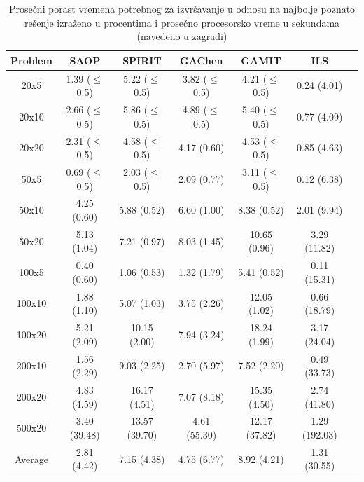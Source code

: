 \documentclass[a4paper]{article}
\begin{document}
\begin{table}[H]
\caption{Prosečni porast vremena potrebnog za izvršavanje u odnosu na najbolje poznato rešenje izraženo u procentima i prosečno procesorsko vreme u sekundama (navedeno u zagradi)
\cite{aComprehensiveReviewAndEvaluationOfPermutationFlowshopHeuristics}}
\label{tab:alg}
\begin{center}
    \begin{adjustbox}{max width=1.0\linewidth,center}
 \begin{tabular}{c c c c c c c} 
 \hline
 Problem & SAOP & SPIRIT & GAChen & GAMIT & ILS &\\ [0.5ex] 
 \hline\hline
 20x5 & 1.39 ($\leq$0.5) & 5.22 ($\leq$0.5) & 3.82 ($\leq$0.5) & 4.21 ($\leq$0.5) & 0.24 (4.01) &\\ [1ex]
 \hline
 20x10 & 2.66 ($\leq$0.5) & 5.86 ($\leq$0.5) & 4.89 ($\leq$0.5) & 5.40 ($\leq$0.5) & 0.77 (4.09) &\\ [1ex]
 \hline
 20x20 & 2.31 ($\leq$0.5) & 4.58 ($\leq$0.5) & 4.17 (0.60) & 4.53 ($\leq$0.5) & 0.85 (4.63) &\\ [1ex]
 \hline
 50x5 & 0.69 ($\leq$0.5) & 2.03 ($\leq$0.5) & 2.09 (0.77) & 3.11 ($\leq$0.5) & 0.12 (6.38) &\\ [1ex]
 \hline
 50x10 & 4.25 (0.60) & 5.88 (0.52) & 6.60 (1.00) & 8.38 (0.52) & 2.01 (9.94) &\\ [1ex] 
 \hline
 50x20 & 5.13 (1.04) & 7.21 (0.97) & 8.03 (1.45) & 10.65 (0.96) & 3.29 (11.82) &\\ [1ex] 
 \hline
 100x5 & 0.40 (0.60) & 1.06 (0.53) & 1.32 (1.79) & 5.41 (0.52) & 0.11 (15.31) &\\ [1ex] 
 \hline
 100x10 & 1.88 (1.10) & 5.07 (1.03) & 3.75 (2.26) & 12.05 (1.02) & 0.66 (18.79) &\\ [1ex] 
 \hline
 100x20 & 5.21 (2.09) & 10.15 (2.00) & 7.94 (3.24) &18.24 (1.99) & 3.17 (24.04) &\\ [1ex] 
 \hline
 200x10 & 1.56 (2.29) & 9.03 (2.25) & 2.70 (5.97) & 7.52 (2.20) & 0.49 (33.73) &\\ [1ex] 
 \hline
 200x20 & 4.83 (4.59) & 16.17 (4.51) & 7.07 (8.18) & 15.35 (4.50) & 2.74 (41.80) &\\ [1ex] 
 \hline
 500x20 & 3.40 (39.48) & 13.57 (39.70) & 4.61 (55.30) & 12.17 (37.82) & 1.29 (192.03) &\\ [1ex] 
 \hline
 \hline
 Average & 2.81 (4.42) & 7.15 (4.38) & 4.75 (6.77) & 8.92 (4.21) & 1.31 (30.55) &\\ [1ex] 
 \hline
 \end{tabular}
\end{adjustbox}
\end{center}
\end{table}
\end{document}
